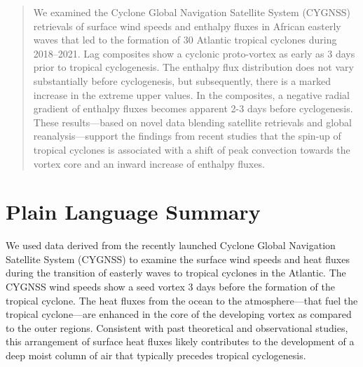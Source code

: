 \documentclass[draft]{agujournal2019}
\providecommand{\DIFdelbegin}{} %
\begin{document}

\begin{abstract}
We examined the Cyclone Global Navigation Satellite System (CYGNSS) retrievals of surface wind speeds and enthalpy fluxes in African easterly waves that led to the formation of 30 Atlantic tropical cyclones during 2018--2021. Lag composites show a cyclonic proto-vortex as early as 3 days prior to tropical cyclogenesis. The enthalpy flux distribution does not vary substantially before cyclogenesis, but subsequently, there is a marked increase in the extreme upper values. In the composites, a negative radial gradient of enthalpy fluxes becomes apparent 2-3 days before cyclogenesis. These results---based on novel data blending satellite retrievals and global reanalysis---support the findings from recent studies that the spin-up of tropical cyclones is associated with a shift of peak convection towards the vortex core and an inward increase of enthalpy fluxes. 
\end{abstract}


\section*{Plain Language Summary}
We used data derived from the recently launched Cyclone Global Navigation Satellite System (CYGNSS) to examine the surface wind speeds and heat fluxes during the transition of easterly waves to tropical cyclones in the Atlantic. The CYGNSS wind speeds show a seed vortex 3 days before the formation of the tropical cyclone. The heat fluxes from the ocean to the atmosphere---that fuel the tropical cyclone---are enhanced in the core of the developing vortex as compared to the outer regions. Consistent with past theoretical and observational studies, this arrangement of surface heat fluxes likely contributes to the development of a deep moist column of air that typically precedes tropical cyclogenesis. 

%
%
\DIFdelbegin %
\end{document}
